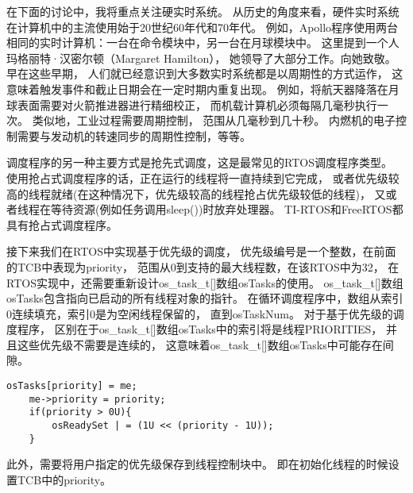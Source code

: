 在下面的讨论中，我将重点关注硬实时系统。
从历史的角度来看，硬件实时系统在计算机中的主流使用始于20世纪60年代和70年代。
例如，Apollo程序使用两台相同的实时计算机：一台在命令模块中，另一台在月球模块中。
这里提到一个人玛格丽特·汉密尔顿（Margaret Hamilton），
她领导了大部分工作。向她致敬。
早在这些早期，
人们就已经意识到大多数实时系统都是以周期性的方式运作，
这意味着触发事件和截止日期会在一定时期内重复出现。
例如，将航天器降落在月球表面需要对火箭推进器进行精细校正，
而机载计算机必须每隔几毫秒执行一次。
类似地，工业过程需要周期控制，
范围从几毫秒到几十秒。
内燃机的电子控制需要与发动机的转速同步的周期性控制，等等。


调度程序的另一种主要方式是抢先式调度，这是最常见的RTOS调度程序类型。
使用抢占式调度程序的话，正在运行的线程将一直持续到它完成，
或者优先级较高的线程就绪(在这种情况下，优先级较高的线程抢占优先级较低的线程)，
又或者线程在等待资源(例如任务调用sleep())时放弃处理器。
TI-RTOS\cite{he2005timed}和FreeRTOS都具有抢占式调度程序。

接下来我们在RTOS中实现基于优先级的调度，
优先级编号是一个整数，在前面的TCB中表现为priority，
范围从0到支持的最大线程数，在该RTOS中为32，
在RTOS实现中，还需要重新设计os\_task\_t[]数组osTasks的使用。
os\_task\_t[]数组osTasks包含指向已启动的所有线程对象的指针。
在循环调度程序中，数组从索引0连续填充，索引0是为空闲线程保留的，
直到osTaskNum。
对于基于优先级的调度程序，
区别在于os\_task\_t[]数组osTasks中的索引将是线程PRIORITIES，
并且这些优先级不需要是连续的，
这意味着os\_task\_t[]数组osTasks中可能存在间隙。
\begin{lstlisting}[language={[ANSI]C},keywordstyle=\color{blue!70},commentstyle=\color{red!50!green!50!blue!50},frame=shadowbox, rulesepcolor=\color{red!20!green!20!blue!20}]
    osTasks[priority] = me;
    me->priority = priority;
    if(priority > 0U){
        osReadySet | = (1U << (priority - 1U));
    }
\end{lstlisting}
此外，需要将用户指定的优先级保存到线程控制块中。
即在初始化线程的时候设置TCB中的priority。

